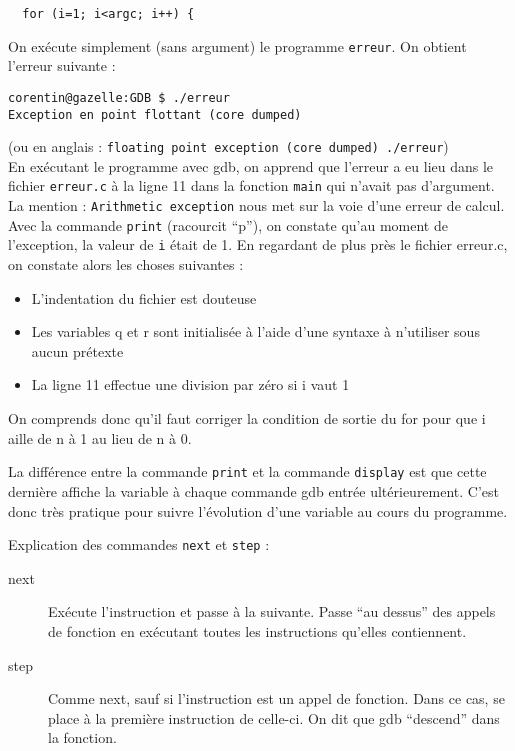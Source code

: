 \documentclass[10pt]{article}
\begin{document}
\begin{enumerate}[label=\textbf{[\alph*]}]
\begin{verbatim}
  for (i=1; i<argc; i++) {
\end{verbatim}

\item On exécute simplement (sans argument) le programme
  \texttt{erreur}. On obtient l'erreur suivante :

\begin{verbatim}
corentin@gazelle:GDB $ ./erreur
Exception en point flottant (core dumped)
\end{verbatim}

(ou en anglais :  \texttt{floating point exception (core dumped)
  ./erreur}) \\

En exécutant le programme avec gdb, on apprend que l'erreur a eu lieu
dans le fichier \texttt{erreur.c} à la ligne 11 dans la fonction
\texttt{main} qui n'avait pas d'argument. La mention :
\texttt{Arithmetic exception} nous met sur la voie d'une erreur de
calcul. \\

Avec la commande \texttt{print} (racourcit ``p''), on constate qu'au
moment de l'exception, la valeur de \texttt{i} était de 1. En
regardant de plus près le fichier erreur.c, on constate alors les
choses suivantes :

\begin{itemize}
\item L'indentation du fichier est douteuse
\item Les variables q et r sont initialisée à l'aide d'une syntaxe à
  n'utiliser sous aucun prétexte
\item La ligne 11 effectue une division par zéro si i vaut 1
\end{itemize}

On comprends donc qu'il faut corriger la condition de sortie du for
pour que i aille de n à 1 au lieu de n à 0.

\item La différence entre la commande \texttt{print} et la commande
  \texttt{display} est que cette dernière affiche la variable à chaque
  commande gdb entrée ultérieurement. C'est donc très pratique pour
  suivre l'évolution d'une variable au cours du programme.

\item Explication des commandes \texttt{next} et \texttt{step} :
  \begin{description}
  \item[next] Exécute l'instruction et passe à la suivante. Passe ``au
    dessus'' des appels de fonction en exécutant toutes les
    instructions qu'elles contiennent.
  \item[step] Comme next, sauf si l'instruction est un appel de
    fonction. Dans ce cas, se place à la première instruction de
    celle-ci. On dit que gdb ``descend'' dans la fonction.
  \end{description}


\end{enumerate}
\end{document}
